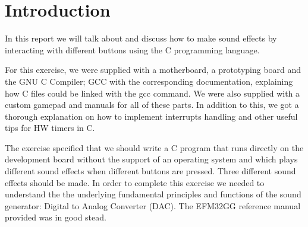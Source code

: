 

\chapter{Introduction}

In this report we will talk about and discuss how to make sound effects by interacting with different buttons using the C programming language. 

For this exercise, we were supplied with a motherboard, a prototyping board and the GNU C Compiler; GCC with the corresponding documentation, explaining how C files could be linked with the gcc command.  We were also supplied with a custom gamepad and manuals for all of these parts. In addition to this, we got a thorough explanation on how to implement interrupts handling and other useful tips for HW timers in C. 

The exercise specified that we should write a C program that runs directly on the development board without the support of an operating system and which plays different sound effects when different buttons are pressed. Three different sound effects should be made. In order to complete this exercise we needed to understand the the underlying fundamental principles and functions of the sound generator: Digital to Analog Converter (DAC). The EFM32GG reference manual provided was in good stead. 

